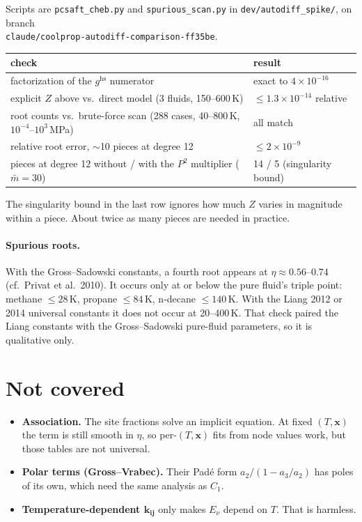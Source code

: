 \documentclass[11pt]{article}
\newcommand{\mbar}{\bar m}
\begin{document}
Scripts are \texttt{pcsaft\_cheb.py} and \texttt{spurious\_scan.py} in
\texttt{dev/autodiff\_spike/}, on branch\\
\texttt{claude/coolprop-autodiff-comparison-ff35be}.
\begin{center}
\begin{tabular}{@{}ll@{}}
\toprule
check & result \\
\midrule
factorization of the $g^{\mathrm{hs}}$ numerator & exact to $4\times10^{-16}$ \\
explicit $Z$ above vs.\ direct model (3 fluids, 150--600\,K) & $\le 1.3\times10^{-14}$ relative \\
root counts vs.\ brute-force scan (288 cases, 40--800\,K, $10^{-4}$--$10^{3}$\,MPa) & all match \\
relative root error, $\sim$10 pieces at degree 12 & $\le 2\times10^{-9}$ \\
pieces at degree 12 without / with the $P^2$ multiplier ($\mbar = 30$) & 14 / 5 (singularity bound) \\
\bottomrule
\end{tabular}
\end{center}
The singularity bound in the last row ignores how much $Z$ varies in magnitude within a piece.
About twice as many pieces are needed in practice.

\paragraph{Spurious roots.} With the Gross--Sadowski constants, a fourth root appears at
$\eta \approx 0.56$--$0.74$ (cf.\ Privat et al.\ 2010). It occurs only at or below the pure
fluid's triple point: methane $\le 28$\,K, propane $\le 84$\,K, n-decane $\le 140$\,K. With the
Liang 2012 or 2014 universal constants it does not occur at 20--400\,K. That check paired the
Liang constants with the Gross--Sadowski pure-fluid parameters, so it is qualitative only.

\section{Not covered}
\begin{itemize}
\item \textbf{Association.} The site fractions solve an implicit equation. At fixed
$(T,\mathbf x)$ the term is still smooth in $\eta$, so per-$(T,\mathbf x)$ fits from node values
work, but those tables are not universal.
\item \textbf{Polar terms (Gross--Vrabec).} Their Pad\'e form $a_2/(1-a_3/a_2)$ has poles of its
own, which need the same analysis as $C_1$.
\item \textbf{Temperature-dependent $\boldsymbol{k_{ij}}$} only makes $E_\nu$ depend on $T$. That is harmless.
\end{itemize}
\end{document}
